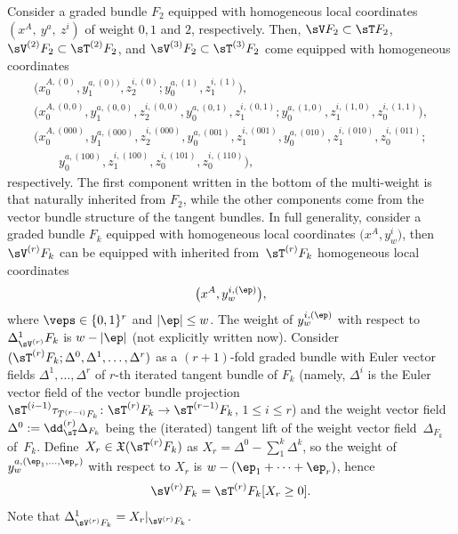 \begin{Example}
Consider a graded bundle $F_{2}$ equipped with homogeneous local coordinates $(x^{A}, ~ y^{a}, ~ z^{i})$ of weight $0,1$ and $2$, respectively. Then, $\sV F_2\subset \sT F_2$, $\sV^{(2)}F_{2} \subset \sT^{(2)} F_2$, and $\sV^{(3)} F_2\subset \sT^{(3)} F_2$ come equipped with homogeneous coordinates
\begin{gather*}
\big(x^{A,(0)}_0, y^{a,(0))}_1, z^{i,(0)}_2; y^{a,(1)}_0, z^{i,(1)}_1\big), \\
\big(x^{A, (0,0)}_{0}, y^{a, (0,0)}_{1}, z^{i, (0,0)}_{2}, y^{a, (0,1)}_{0}, z^{i, (0,1)}_{1}; y^{a,(1, 0)}_{0}, z^{i, (1,0)}_{1}, z^{i, (1,1)}_{0}\big), \\
\big(x^{A, (000)}_{0}, y^{a, (000)}_1, z^{i, (000)}_2, y^{a, (001)}_0, z^{i, (001)}_1, y^{a,(010)}_0, z^{i, (010)}_1, z^{i, (011)}_0;  \\
\qquad {} y^{a,(100)}_0, z^{i,(100)}_1, z^{i,(101)}_0, z^{i,(110)}_0\big),
\end{gather*}
respectively. The f\/irst component written in the bottom of the multi-weight is that naturally inherited from $F_{2}$, while the other components come from the vector bundle structure of the tangent bundles. In full generality, consider a graded bundle $F_{k}$ equipped with homogeneous local coordinates $\big(x^{A}, y^i_w\big)$, then $\sV^{(r)}F_{k}$ can be equipped with inherited from~$\sT^{(r)} F_k$ homogeneous local coordinates
\begin{gather*}
\big(x^A, y^{i, (\ep)}_w\big),
\end{gather*}
where $\veps\in\{0,1\}^{r}$ and $|\ep|\leq w$. The weight of $y^{i, (\ep)}_w$ with respect to $\Delta^1_{\sV^{(r)}} F_k$ is $w - |\ep|$ (not explicitly written now). Consider $(\sT^{(r)} F_k; \Delta^0, \Delta^1, \ldots, \Delta^r)$ as a $(r+1)$-fold graded bundle with Euler vector f\/ields $\Delta^1, \ldots, \Delta^r$ of $r$-th iterated tangent bundle of $F_k$ (namely, $\Delta^i$ is the Euler vector f\/ield of the vector bundle projection $\sT^{(i-1)} \tau_{T^{(r-i)} F_k}\colon \sT^{(r)} F_k \rightarrow \sT^{(r-1)} F_k$, $1\leq i\leq r$) and the weight vector f\/ield $\Delta^0:= \dd_{\sT}^{(r)}\Delta_{F_k}$ being the (iterated) tangent lift of the weight vector f\/ield~$\Delta_{F_k}$ of~$F_k$. Def\/ine~$X_r \in \mathfrak{X}(\sT^{(r)} F_k)$ as $X_r = \Delta^0 - \sum_1^k \Delta^k$, so the weight of $y^{a, (\ep_1, \ldots, \ep_r)}_w$ with respect to $X_r$ is $w-(\ep_1+\cdots+\ep_r)$, hence
 \begin{gather}\label{eqn:V_r}
 \sV^{(r)} F_k = \sT^{(r)}F_k[X_r\geq 0].
 \end{gather}
Note that $\Delta^{1}_{\sV^{(r)}F_{k}} = X_{r}|_{\sV^{(r)}F_{k}}$.
\end{Example}

